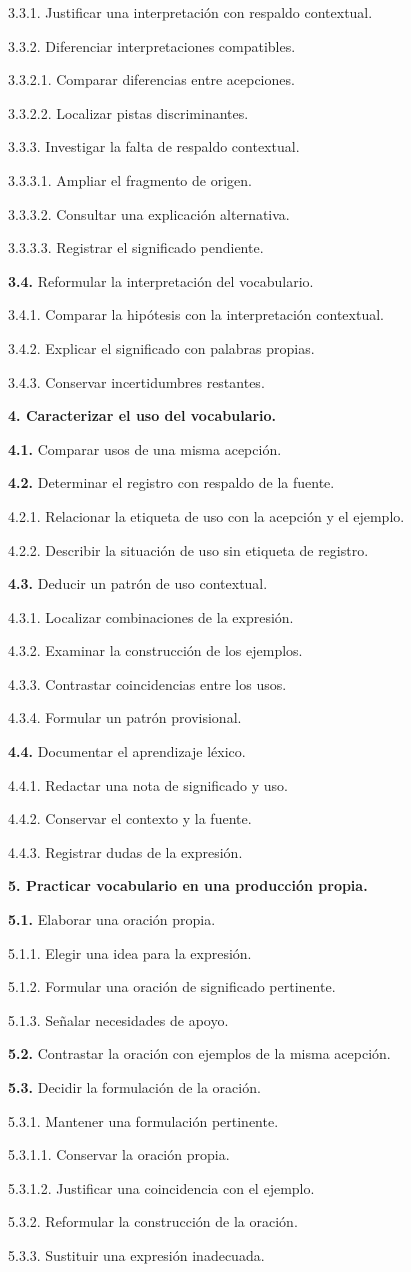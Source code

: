 \documentclass[10pt,a4paper]{article}
\newcommand{\HTAline}[3]{\par\noindent\hspace*{#1cm}\begin{minipage}{\dimexpr\linewidth-#1cm\relax}#3 #2\end{minipage}\par}
\begin{document}
\HTAline{0.8}{3.3.1. Justificar una interpretación con respaldo contextual.}{}
\HTAline{0.8}{3.3.2. Diferenciar interpretaciones compatibles.}{}
\HTAline{1.2000000000000002}{3.3.2.1. Comparar diferencias entre acepciones.}{}
\HTAline{1.2000000000000002}{3.3.2.2. Localizar pistas discriminantes.}{}
\HTAline{0.8}{3.3.3. Investigar la falta de respaldo contextual.}{}
\HTAline{1.2000000000000002}{3.3.3.1. Ampliar el fragmento de origen.}{}
\HTAline{1.2000000000000002}{3.3.3.2. Consultar una explicación alternativa.}{}
\HTAline{1.2000000000000002}{3.3.3.3. Registrar el significado pendiente.}{}
\HTAline{0.4}{\textbf{3.4.} Reformular la interpretación del vocabulario.}{}
\HTAline{0.8}{3.4.1. Comparar la hipótesis con la interpretación contextual.}{}
\HTAline{0.8}{3.4.2. Explicar el significado con palabras propias.}{}
\HTAline{0.8}{3.4.3. Conservar incertidumbres restantes.}{}
\HTAline{0.0}{\textbf{4. Caracterizar el uso del vocabulario.}}{}
\HTAline{0.4}{\textbf{4.1.} Comparar usos de una misma acepción.}{}
\HTAline{0.4}{\textbf{4.2.} Determinar el registro con respaldo de la fuente.}{}
\HTAline{0.8}{4.2.1. Relacionar la etiqueta de uso con la acepción y el ejemplo.}{}
\HTAline{0.8}{4.2.2. Describir la situación de uso sin etiqueta de registro.}{}
\HTAline{0.4}{\textbf{4.3.} Deducir un patrón de uso contextual.}{}
\HTAline{0.8}{4.3.1. Localizar combinaciones de la expresión.}{}
\HTAline{0.8}{4.3.2. Examinar la construcción de los ejemplos.}{}
\HTAline{0.8}{4.3.3. Contrastar coincidencias entre los usos.}{}
\HTAline{0.8}{4.3.4. Formular un patrón provisional.}{}
\HTAline{0.4}{\textbf{4.4.} Documentar el aprendizaje léxico.}{}
\HTAline{0.8}{4.4.1. Redactar una nota de significado y uso.}{}
\HTAline{0.8}{4.4.2. Conservar el contexto y la fuente.}{}
\HTAline{0.8}{4.4.3. Registrar dudas de la expresión.}{}
\HTAline{0.0}{\textbf{5. Practicar vocabulario en una producción propia.}}{}
\HTAline{0.4}{\textbf{5.1.} Elaborar una oración propia.}{}
\HTAline{0.8}{5.1.1. Elegir una idea para la expresión.}{}
\HTAline{0.8}{5.1.2. Formular una oración de significado pertinente.}{}
\HTAline{0.8}{5.1.3. Señalar necesidades de apoyo.}{}
\HTAline{0.4}{\textbf{5.2.} Contrastar la oración con ejemplos de la misma acepción.}{}
\HTAline{0.4}{\textbf{5.3.} Decidir la formulación de la oración.}{}
\HTAline{0.8}{5.3.1. Mantener una formulación pertinente.}{}
\HTAline{1.2000000000000002}{5.3.1.1. Conservar la oración propia.}{}
\HTAline{1.2000000000000002}{5.3.1.2. Justificar una coincidencia con el ejemplo.}{}
\HTAline{0.8}{5.3.2. Reformular la construcción de la oración.}{}
\HTAline{0.8}{5.3.3. Sustituir una expresión inadecuada.}{}
\end{document}
